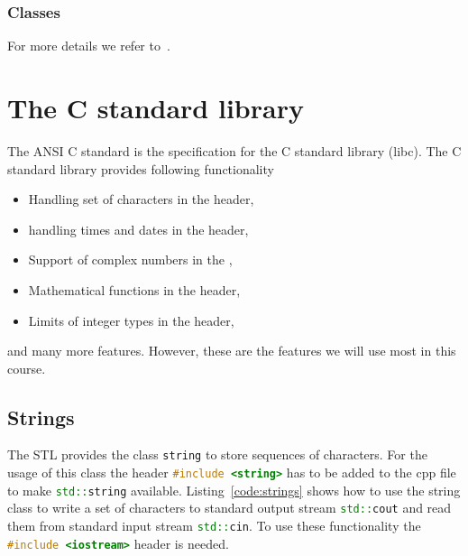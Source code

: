 \subsection{Classes}
For more details we refer to~\cite[Chapter~4]{andrew2000accelerated}.

\theendnotes

\chapter{The C standard library}
\label{chapter:cpp:lib}
The ANSI C standard is the specification for the C standard library (libc). The C standard library provides following functionality
\begin{itemize}
\item Handling set of characters in the  header,
\item handling times and dates in the  header,
\item Support of complex numbers in the ,
\item Mathematical functions in the  header,
\item Limits of integer types in the  header,
\end{itemize}
and many more features. However, these are the features we will use most in this course. 

\section{Strings}
The STL provides the class \lstinline[language=C++]{string} to store sequences of characters. For the usage of this class the header \lstinline[language=c++]{#include <string>} has to be added to the cpp file to make \lstinline[language=c++]{std::string} available. Listing~\ref{code:strings} shows how to use the string class to write a set of characters to standard output stream \lstinline[language=c++]{std::cout} and read them from standard input stream \lstinline[language=c++]{std::cin}. To use these functionality the \lstinline[language=c++]{#include <iostream>} header is needed.  \\

